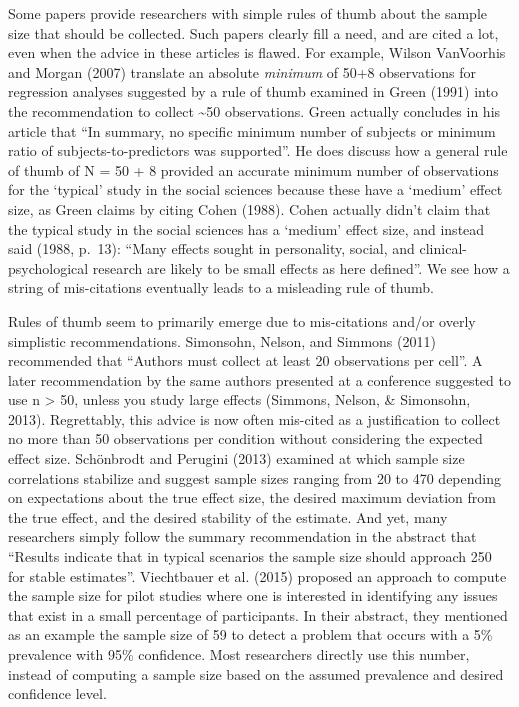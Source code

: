 \documentclass[
  english,
  ,jou, a4paper,floatsintext]{apa6}
\begin{document}
Some papers provide researchers with simple rules of thumb about the sample size that should be collected. Such papers clearly fill a need, and are cited a lot, even when the advice in these articles is flawed. For example, Wilson VanVoorhis and Morgan (2007) translate an absolute \emph{minimum} of 50+8 observations for regression analyses suggested by a rule of thumb examined in Green (1991) into the recommendation to collect \textasciitilde50 observations. Green actually concludes in his article that ``In summary, no specific minimum number of subjects or minimum ratio of subjects-to-predictors was supported''. He does discuss how a general rule of thumb of N = 50 + 8 provided an accurate minimum number of observations for the `typical' study in the social sciences because these have a `medium' effect size, as Green claims by citing Cohen (1988). Cohen actually didn't claim that the typical study in the social sciences has a `medium' effect size, and instead said (1988, p.~13): ``Many effects sought in personality, social, and clinical-psychological research are likely to be small effects as here defined''. We see how a string of mis-citations eventually leads to a misleading rule of thumb.

Rules of thumb seem to primarily emerge due to mis-citations and/or overly simplistic recommendations. Simonsohn, Nelson, and Simmons (2011) recommended that ``Authors must collect at least 20 observations per cell''. A later recommendation by the same authors presented at a conference suggested to use n \textgreater{} 50, unless you study large effects (Simmons, Nelson, \& Simonsohn, 2013). Regrettably, this advice is now often mis-cited as a justification to collect no more than 50 observations per condition without considering the expected effect size. Schönbrodt and Perugini (2013) examined at which sample size correlations stabilize and suggest sample sizes ranging from 20 to 470 depending on expectations about the true effect size, the desired maximum deviation from the true effect, and the desired stability of the estimate. And yet, many researchers simply follow the summary recommendation in the abstract that ``Results indicate that in typical scenarios the sample size should approach 250 for stable estimates''. Viechtbauer et al. (2015) proposed an approach to compute the sample size for pilot studies where one is interested in identifying any issues that exist in a small percentage of participants. In their abstract, they mentioned as an example the sample size of 59 to detect a problem that occurs with a 5\% prevalence with 95\% confidence. Most researchers directly use this number, instead of computing a sample size based on the assumed prevalence and desired confidence level.
\end{document}
